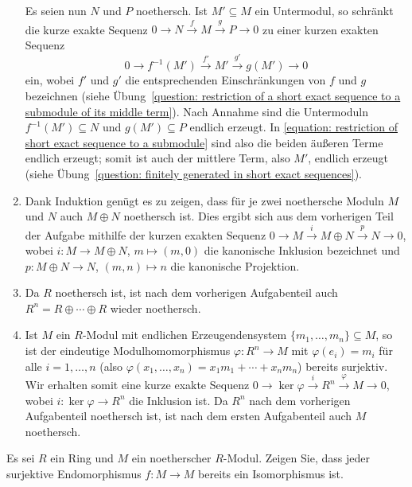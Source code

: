 \begin{question}
\begin{enumerate}
      Es seien nun $N$ und $P$ noethersch.
      Ist $M' \subseteq M$ ein Untermodul, so schränkt die kurze exakte Sequenz $0 \to N \xrightarrow{f} M \xrightarrow{g} P \to 0$ zu einer kurzen exakten Sequenz
      \begin{equation}
        \label{equation: restriction of short exact sequence to a submodule}
        0 \to f^{-1}(M') \xrightarrow{f'} M' \xrightarrow{g'} g(M') \to 0
      \end{equation}
      ein, wobei $f'$ und $g'$ die entsprechenden Einschränkungen von $f$ und $g$ bezeichnen (siehe Übung~\ref{question: restriction of a short exact sequence to a submodule of its middle term}).
      Nach Annahme sind die Untermoduln $f^{-1}(M') \subseteq N$ und $g(M') \subseteq P$ endlich erzeugt.
      In \eqref{equation: restriction of short exact sequence to a submodule} sind also die beiden äußeren Terme endlich erzeugt;
      somit ist auch der mittlere Term, also $M'$, endlich erzeugt (siehe Übung~\ref{question: finitely generated in short exact sequences}).
    \item
      Dank Induktion genügt es zu zeigen, dass für je zwei noethersche Moduln $M$ und $N$ auch $M \oplus N$ noethersch ist.
      Dies ergibt sich aus dem vorherigen Teil der Aufgabe mithilfe der kurzen exakten Sequenz $0 \to M \xrightarrow{i} M \oplus N \xrightarrow{p} N \to 0$, wobei $i \colon M \to M \oplus N$, $m \mapsto (m,0)$ die kanonische Inklusion bezeichnet und $p \colon M \oplus N \to N$, $(m,n) \mapsto n$ die kanonische Projektion.
    \item
      Da $R$ noethersch ist, ist nach dem vorherigen Aufgabenteil auch $R^n = R \oplus \dotsb \oplus R$ wieder noethersch.
    \item
      Ist $M$ ein $R$-Modul mit endlichen Erzeugendensystem $\{m_1, \dotsc, m_n\} \subseteq M$, so ist der eindeutige Modulhomomorphismus $\varphi \colon R^n \to M$ mit $\varphi(e_i) = m_i$ für alle $i = 1, \dotsc, n$ (also $\varphi(x_1, \dotsc, x_n) = x_1 m_1 + \dotsb + x_n m_n$) bereits surjektiv.
      Wir erhalten somit eine kurze exakte Sequenz $0 \to \ker \varphi \xrightarrow{i} R^n \xrightarrow{\varphi} M \to 0$, wobei $i \colon \ker \varphi \to R^n$ die Inklusion ist.
      Da $R^n$ nach dem vorherigen Aufgabenteil noethersch ist, ist nach dem ersten Aufgabenteil auch $M$ noethersch.
  \end{enumerate}
\end{question}


\begin{question}
  \label{question: surjective endomorphisms of noetherian modules are isomorphisms}
  Es sei $R$ ein Ring und $M$ ein noetherscher $R$-Modul.
  Zeigen Sie, dass jeder surjektive Endomorphismus $f \colon M \to M$ bereits ein Isomorphismus ist.
\end{question}


